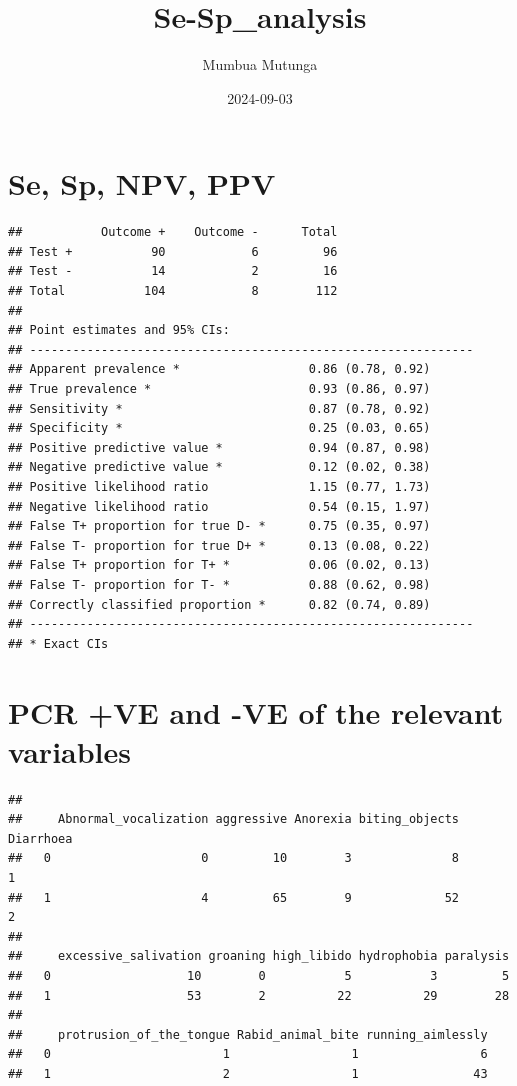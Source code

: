 \documentclass[
]{article}
\title{Se-Sp\_analysis}
\author{Mumbua Mutunga}
\date{2024-09-03}
\begin{document}
\maketitle

\section{Se, Sp, NPV, PPV}\label{se-sp-npv-ppv}

\begin{verbatim}
##           Outcome +    Outcome -      Total
## Test +           90            6         96
## Test -           14            2         16
## Total           104            8        112
## 
## Point estimates and 95% CIs:
## --------------------------------------------------------------
## Apparent prevalence *                  0.86 (0.78, 0.92)
## True prevalence *                      0.93 (0.86, 0.97)
## Sensitivity *                          0.87 (0.78, 0.92)
## Specificity *                          0.25 (0.03, 0.65)
## Positive predictive value *            0.94 (0.87, 0.98)
## Negative predictive value *            0.12 (0.02, 0.38)
## Positive likelihood ratio              1.15 (0.77, 1.73)
## Negative likelihood ratio              0.54 (0.15, 1.97)
## False T+ proportion for true D- *      0.75 (0.35, 0.97)
## False T- proportion for true D+ *      0.13 (0.08, 0.22)
## False T+ proportion for T+ *           0.06 (0.02, 0.13)
## False T- proportion for T- *           0.88 (0.62, 0.98)
## Correctly classified proportion *      0.82 (0.74, 0.89)
## --------------------------------------------------------------
## * Exact CIs
\end{verbatim}

\section{PCR +VE and -VE of the relevant
variables}\label{pcr-ve-and--ve-of-the-relevant-variables}

\begin{verbatim}
##    
##     Abnormal_vocalization aggressive Anorexia biting_objects Diarrhoea
##   0                     0         10        3              8         1
##   1                     4         65        9             52         2
##    
##     excessive_salivation groaning high_libido hydrophobia paralysis
##   0                   10        0           5           3         5
##   1                   53        2          22          29        28
##    
##     protrusion_of_the_tongue Rabid_animal_bite running_aimlessly
##   0                        1                 1                 6
##   1                        2                 1                43
\end{verbatim}
\end{document}
